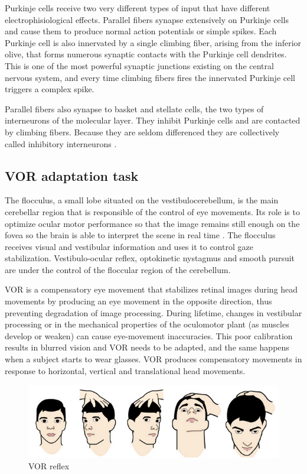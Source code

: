 \documentclass[12pt, a4paper,twoside]{tesi_upf}
\begin{document}
Purkinje cells receive two very different types of input that have different electrophisiological effects. Parallel fibers synapse extensively on Purkinje cells and cause them to produce normal action potentials or simple spikes. Each Purkinje cell is also innervated by a single climbing fiber, arising from the inferior olive, that forms numerous synaptic contacts with the Purkinje cell dendrites. This is one of the most powerful synaptic junctions existing on the central nervous system, and every time climbing fibers fires the innervated Purkinje cell triggers a complex spike.

Parallel fibers also synapse to basket and stellate cells, the two types of interneurons of the molecular layer. They inhibit Purkinje cells and are contacted by climbing fibers. Because they are seldom differenced they are collectively called inhibitory interneurons \cite{Jorntell2010}.

\subsection{VOR adaptation task}

The flocculus, a small lobe situated on the vestibulocerebellum, is the main cerebellar region that is responsible of the control of eye movements. Its role is to optimize ocular motor performance so that the image remains still enough on the fovea so the brain is able to interpret the scene in real time \cite{Kheradmand2011}. The flocculus receives visual and vestibular information and uses it to control gaze stabilization. Vestibulo-ocular reflex, optokinetic nystagmus and smooth pursuit are under the control of the floccular region of the cerebellum.

VOR is a compensatory eye movement that stabilizes retinal images during head movements by producing an eye movement in the opposite direction, thus preventing degradation of image processing. During lifetime, changes in vestibular processing or in the mechanical properties of the oculomotor plant (as muscles develop or weaken) can cause eye-movement inaccuracies. This poor calibration results in blurred vision and VOR needs to be adapted, and the same happens when a subject starts to wear glasses. VOR produces compensatory movements in response to horizontal, vertical and translational head movements.

\begin{figure}
  \centering
  \includegraphics[scale=0.50]{images/vor.png}
  \caption[VOR reflex]{VOR reflex}
\end{figure}
\end{document}

